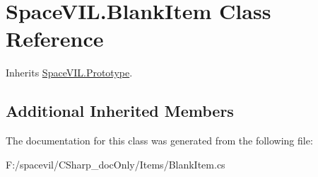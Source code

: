 \hypertarget{class_space_v_i_l_1_1_blank_item}{}\section{Space\+V\+I\+L.\+Blank\+Item Class Reference}
\label{class_space_v_i_l_1_1_blank_item}


Inherits \mbox{\hyperlink{class_space_v_i_l_1_1_prototype}{Space\+V\+I\+L.\+Prototype}}.

\subsection*{Additional Inherited Members}


The documentation for this class was generated from the following file\+:\begin{DoxyCompactItemize}
\item 
F\+:/spacevil/\+C\+Sharp\+\_\+doc\+Only/\+Items/Blank\+Item.\+cs\end{DoxyCompactItemize}
